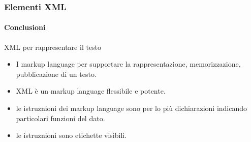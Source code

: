 




\begin{frame}
    \frametitle{Elementi XML}
    \framesubtitle{Conclusioni}
    \addtocounter{nframe}{1}

    \begin{block}{XML per rappresentare il testo}
        \begin{itemize}
            \item I markup language per supportare la rappresentazione, memorizzazione, pubblicazione di un testo.
            \item XML è un markup language flessibile e potente.
        \end{itemize}

        \begin{itemize}
            \item le istruznioni dei markup language sono per lo più dichiarazioni indicando particolari funzioni del dato.
            \item le istruznioni sono etichette visibili.
        \end{itemize}
        
    \end{block}

\end{frame}

